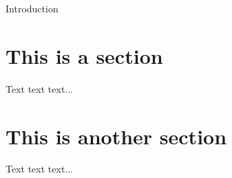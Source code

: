 Introduction

\section{This is a section}
Text text text...

\section{This is another section}
Text text text...
